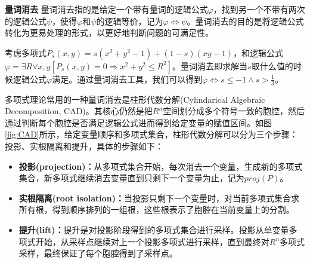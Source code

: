 \begin{definition}{\textbf{量词消去}}
量词消去指的是给定一个带有量词的逻辑公式$\varphi$，找到另一个不带有两次的逻辑公式$\psi$，使得$\varphi$和$\psi$的逻辑等价，记为$\varphi \Leftrightarrow \psi$。量词消去的目的是将逻辑公式转化为更易处理的形式，以更好地判断问题的可满足性。
\end{definition}

\begin{example}
考虑多项式$P_s(x, y) = s(x^2 + y^2 - 1) + (1 - s)(xy - 1)$，和逻辑公式$\varphi = \exists R \forall x, y [P_s(x, y) = 0 \Rightarrow x^2 + y^2 \leq R^2]$。量词消去即求解当$s$取什么值的时候逻辑公式$\varphi$满足。通过量词消去工具，我们可以得到$\varphi \Leftrightarrow s \le -1 \wedge s > \frac{1}{3}$。\label{ex:quantifier_elimination}
\end{example}

多项式理论常用的一种量词消去是柱形代数分解(Cylindarical Algebraic Decomposition, CAD)。其核心仍然是把$R^n$空间划分成多个符号一致的胞腔，然后通过判断每个胞腔是否满足逻辑公式进而得到给定变量的赋值区间。如图\ref{fig:CAD}所示，给定变量顺序和多项式集合，柱形代数分解可以分为三个步骤：投影、实根隔离和提升，具体的步骤如下：
\begin{itemize}
    \item \textbf{投影(projection)：}从多项式集合开始，每次消去一个变量，生成新的多项式集合，新多项式继续消去变量直到只剩下一个变量为止，记为$proj(P)$。
    \item \textbf{实根隔离(root isolation)：}当投影只剩下一个变量时，对当前多项式集合求所有根，得到顺序排列的一组根，这些根表示了胞腔在当前变量上的分割。
    \item \textbf{提升(lift)：}提升是对投影阶段得到的多项式集合进行采样。投影从单变量多项式开始，从采样点继续对上一个投影多项式进行采样，直到最终对$R^n$多项式采样，最终保证了每个胞腔得到了采样点。
\end{itemize}

